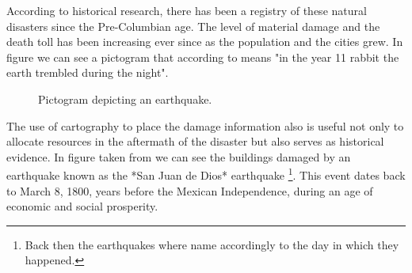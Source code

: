 According to historical research, there has been a registry of these natural disasters since the Pre-Columbian age. The level of material damage and the death toll has been increasing ever since as the population and the cities grew. In figure \cite{fig:codice} we can see a pictogram that according to \cite{sismosmexico} means "in the year 11 rabbit the earth trembled during the night".\\


\begin{figure}[h]
  \begin{center}
  \end{center}
  \caption{Pictogram depicting an earthquake.}
\end{figure}

The use of cartography to place the damage information also is useful not only to allocate resources in the aftermath of the disaster but also serves as historical evidence. In figure \cite{fig:quake1800} taken from \cite{AG3316} we can see the buildings damaged by an earthquake known as the *San Juan de Dios* earthquake \footnote{Back then the earthquakes where name accordingly to the day in which they happened.}. This event dates back to March 8, 1800, years before the Mexican Independence, during an age of economic and social prosperity.\\

